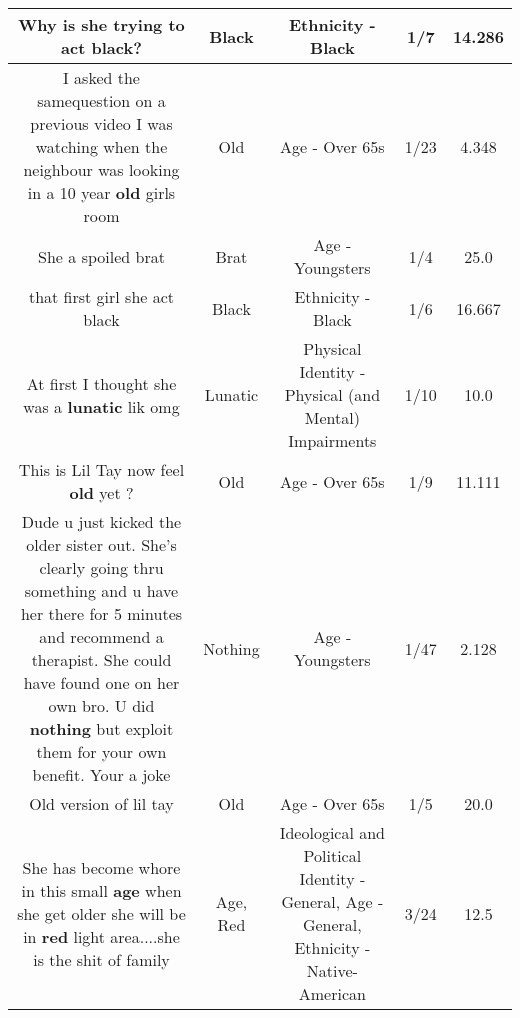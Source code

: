 \documentclass[11pt]{article}
\newlength\mylength
\begin{document}
\begin{center}
\begin{longtable}{|C{.65\mylength}|C{.30\mylength}|C{.12\mylength}|C{.12\mylength}|C{.12\mylength}|}
  \small Why is she trying to act \textbf{black}?\normalsize   & Black & Ethnicity - Black & 1/7 & 14.286 \\  \hline
  \small I asked the samequestion on a previous video I was watching when the neighbour was looking in a 10 year \textbf{old} girls room\normalsize   & Old & Age - Over 65s & 1/23 & 4.348 \\  \hline
  \small She a spoiled brat\normalsize   & Brat & Age - Youngsters & 1/4 & 25.0 \\  \hline
  \small that first girl she act black\normalsize   & Black & Ethnicity - Black & 1/6 & 16.667 \\  \hline
  \small At first I thought she was a \textbf{lunatic} lik omg\normalsize   & Lunatic & Physical Identity - Physical (and Mental) Impairments & 1/10 & 10.0 \\  \hline
  \small This is Lil Tay now feel \textbf{old} yet ?\normalsize   & Old & Age - Over 65s & 1/9 & 11.111 \\  \hline
  \small Dude u just kicked the older sister out. She's clearly going thru something and u have her there for 5 minutes and recommend a therapist. She could have found one on her own bro. U did \textbf{nothing} but exploit them for your own benefit. Your a joke\normalsize   & Nothing & Age - Youngsters & 1/47 & 2.128 \\  \hline
  \small Old version of lil tay\normalsize   & Old & Age - Over 65s & 1/5 & 20.0 \\  \hline
  \small She has become whore in this small \textbf{age} when she get older she will be in \textbf{r\textbf{ed}} light area....she is the shit of family\normalsize   & Age, Red &  Ideological and Political Identity - General, Age - General, Ethnicity - Native-American & 3/24 & 12.5 \\  \hline

\end{longtable}
\end{center}
\end{document}
